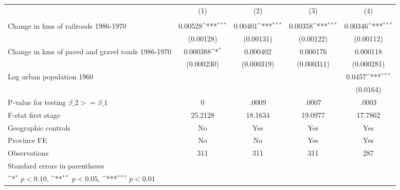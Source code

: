 {
\def\sym#1{\ifmmode^{#1}\else\(^{#1}\)\fi}
\begin{tabular}{l*{4}{c}}
\hline\hline
                &\multicolumn{1}{c}{(1)}&\multicolumn{1}{c}{(2)}&\multicolumn{1}{c}{(3)}&\multicolumn{1}{c}{(4)}\\
                &\multicolumn{1}{c}{}&\multicolumn{1}{c}{}&\multicolumn{1}{c}{}&\multicolumn{1}{c}{}\\
\hline
Change in kms of railroads 1986-1970&  0.00528\sym{***}&  0.00401\sym{***}&  0.00358\sym{***}&  0.00346\sym{***}\\
                &(0.00128)         &(0.00131)         &(0.00122)         &(0.00112)         \\
[1em]
Change in kms of paved and gravel roads 1986-1970& 0.000388\sym{*}  & 0.000402         & 0.000176         & 0.000118         \\
                &(0.000230)         &(0.000319)         &(0.000311)         &(0.000281)         \\
[1em]
Log urban population 1960&                  &                  &                  &   0.0457\sym{***}\\
                &                  &                  &                  & (0.0164)         \\
\hline
P-value for testing $\beta\_{2} >= \beta\_{1}$&        0         &    .0009         &    .0007         &    .0003         \\
F-stat first stage&  25.2128         &  18.1634         &  19.0977         &  17.7862         \\
Geographic controls&       No         &      Yes         &      Yes         &      Yes         \\
Province FE     &       No         &       No         &      Yes         &      Yes         \\
Observations    &      311         &      311         &      311         &      287         \\
\hline\hline
\multicolumn{5}{l}{\footnotesize Standard errors in parentheses}\\
\multicolumn{5}{l}{\footnotesize \sym{*} \(p<0.10\), \sym{**} \(p<0.05\), \sym{***} \(p<0.01\)}\\
\end{tabular}
}
